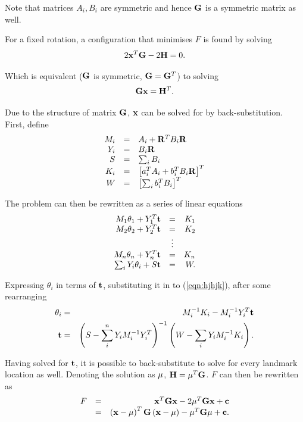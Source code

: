 Note that matrices $A_i,B_i$ are symmetric and hence ${\bf G}$ is a
symmetric matrix as well.

For a fixed rotation, a configuration that minimises $F$ is found by
solving
$$
2{\bf x}^T{\bf G} - 2{\bf H} = 0.
$$

Which is equivalent (${\bf G}$ is symmetric, ${\bf G} = {\bf G}^T$) to
solving
$$
 {\bf Gx} = {\bf H}^T.
$$

Due to the structure of matrix ${\bf G}$, ${\bf x}$ can be solved for
by back-substitution. First, define
\begin{equation}
\begin{array}{rcl}
M_i &=& A_i + {\bf R}^TB_i{\bf R}\\
Y_i &=& B_i{\bf R}\\
S   &=& \sum_i B_i \\
K_i &=& \left[a_i^TA_i + b_i^TB_i{\bf R}\right]^T\\
W   &=& \left[ \sum_i b_i^TB_i \right]^T
\end{array}
\end{equation}

The problem can then be rewritten as a series of linear equations
\begin{equation}
\begin{array}{rcr}
M_1\theta_1 + Y_1^T{\bf t} &=& K_1\\
M_2\theta_2 + Y_2^T{\bf t} &=& K_2\\
&\vdots&\\
M_n\theta_n + Y_n^T{\bf t} &=& K_n\\
\sum_i Y_i\theta_i + S{\bf t} &=& W.
\end{array}
\label{eqn:hjhjk}
\end{equation}

Expressing $\theta_i$ in terms of ${\bf t}$, substituting it in to
(\ref{eqn:hjhjk}), after some rearranging 
\begin{eqnarray}
\theta_i &=& M_i^{-1}K_i - M_i^{-1}Y_i^T{\bf t}\\
{\bf t} &=& \left( S -\sum_i^n Y_iM_i^{-1}Y_i^T \right)^{-1}
\left(W - \sum_i Y_iM_i^{-1}K_i \right).
\end{eqnarray}

Having solved for ${\bf t}$, it is possible to back-substitute to
solve for every landmark location as well. Denoting the solution as
${\bf \mu}$, ${\bf H}={\bf \mu}^T{\bf G}$. $F$ can then be rewritten
as
\begin{equation}
\begin{array}{rcr}
F &=& {\bf x}^T{\bf Gx} - 2{\bf \mu}^T{\bf Gx} + {\bf c}\\
 &=& \left({\bf x - \mu}\right)^T{\bf G}\left( {\bf x - \mu} \right) -
{\bf \mu}^T{\bf G\mu} + {\bf c}.
\end{array}
\end{equation}

